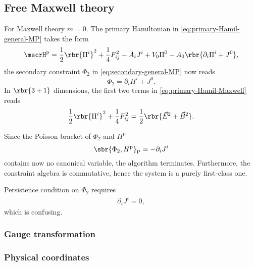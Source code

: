 \documentclass[a4paper,11pt]{article}
\begin{document}
\subsection{Free Maxwell theory}

For Maxwell theory $m = 0$. The primary Hamiltonian in 
\cref{eq:primary-Hamil-general-MP} takes the form
\begin{equation}
\mscrH^\text{p} = \frac{1}{2} \rbr{\Pi^i}^2 + \frac{1}{4} F_{ij}^2 - A_i J^i
+V_0 \Pi^0 - A_0 \rbr{\partial_i \Pi^i + J^0},
\label{eq:primary-Hamil-Maxwell}
\end{equation}
the secondary constraint $\Phi_2$ in \cref{eq:secondary-general-MP} now 
reads
\begin{equation}
\Phi_2 = \partial_i \Pi^i + J^0.
\end{equation}
In $\rbr{3+1}$ dimensions, the first two terms in 
\cref{eq:primary-Hamil-Maxwell} reads
\begin{equation}
\frac{1}{2}\rbr{\Pi^i}^2 + \frac{1}{4}F_{ij}^2 =
\frac{1}{2}\rbr{\vec E^2 + \vec B^2}.
\end{equation}


Since the Poisson bracket of $\Phi_2$ and $H^\text{p}$
\begin{equation}
\sbr{\Phi_2, H^\text{p}}_\text{P} = -\partial_i J^i
\end{equation}
contains now no canonical variable, the algorithm terminates. Furthermore, 
the constraint algebra is commutative, hence the system is a purely 
first-class one.

Persistence condition on $\Phi_2$ requires
\begin{align}
\partial_i J^i = 0,
\end{align}
which is confusing.

\subsubsection{Gauge transformation}

\subsubsection{Physical coordinates}


\printbibliography
\end{document}
